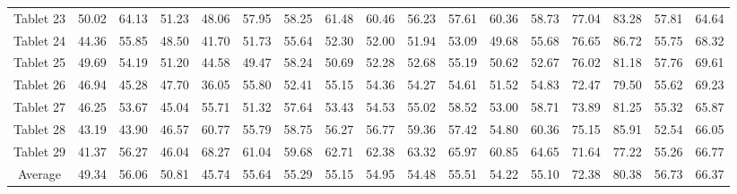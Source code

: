 \documentclass[conference]{IEEEtran}
\begin{document}
\begin{table*}[t!]
\begin{tabular}{ |c|c c c c|c c c c|c c c c|c c c c|}
Tablet 23 & 50.02 & 64.13 & 51.23 & 48.06 & 57.95 & 58.25 & 61.48 & 60.46 & 56.23 & 57.61 & 60.36 & 58.73 & 77.04 & 83.28 & 57.81 & 64.64 \\
Tablet 24 & 44.36 & 55.85 & 48.50 & 41.70 & 51.73 & 55.64 & 52.30 & 52.00 & 51.94 & 53.09 & 49.68 & 55.68 & 76.65 & 86.72 & 55.75 & 68.32 \\
Tablet 25 & 49.69 & 54.19 & 51.20 & 44.58 & 49.47 & 58.24 & 50.69 & 52.28 & 52.68 & 55.19 & 50.62 & 52.67 & 76.02 & 81.18 & 57.76 & 69.61 \\
Tablet 26 & 46.94 & 45.28 & 47.70 & 36.05 & 55.80 & 52.41 & 55.15 & 54.36 & 54.27 & 54.61 & 51.52 & 54.83 & 72.47 & 79.50 & 55.62 & 69.23 \\
Tablet 27 & 46.25 & 53.67 & 45.04 & 55.71 & 51.32 & 57.64 & 53.43 & 54.53 & 55.02 & 58.52 & 53.00 & 58.71 & 73.89 & 81.25 & 55.32 & 65.87 \\
Tablet 28 & 43.19 & 43.90 & 46.57 & 60.77 & 55.79 & 58.75 & 56.27 & 56.77 & 59.36 & 57.42 & 54.80 & 60.36 & 75.15 & 85.91 & 52.54 & 66.05 \\
Tablet 29 & 41.37 & 56.27 & 46.04 & 68.27 & 61.04 & 59.68 & 62.71 & 62.38 & 63.32 & 65.97 & 60.85 & 64.65 & 71.64 & 77.22 & 55.26 & 66.77 \\
\hline
Average   & 49.34 & 56.06 & 50.81 & 45.74 & 55.64 & 55.29 & 55.15 & 54.95 & 54.48 & 55.51 & 54.22 & 55.10 & \cellcolor{Gray} 72.38 & \cellcolor{Gray} 80.38 & 56.73 & \cellcolor{Gray} 66.37\\
\hline
\end{tabular}
\end{table*}
\end{document}
